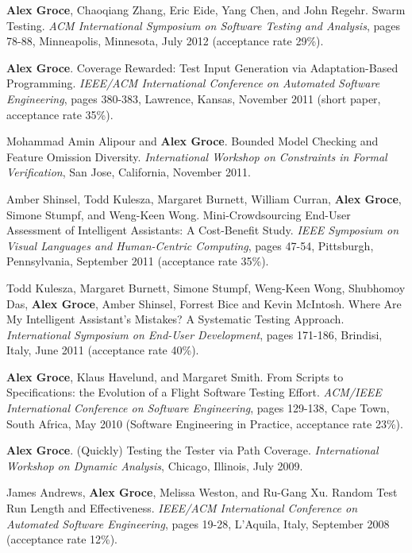 \documentclass[ComputerScience]{vita}
\begin{document}
\begin{vita}
\begin{Refereed Conference and Workshop Publications}
\item {\bf Alex Groce}, Chaoqiang Zhang, Eric Eide, Yang Chen, and John Regehr.
\newblock Swarm Testing.
\newblock \emph{ACM International Symposium on Software Testing and Analysis}, pages 78-88, Minneapolis, Minnesota, July 2012 (acceptance rate 29\%).

\item {\bf Alex Groce}.
\newblock Coverage Rewarded: Test Input Generation via Adaptation-Based Programming.
\newblock \emph{IEEE/ACM International Conference on Automated Software Engineering}, pages 380-383, Lawrence, Kansas, November 2011 (short paper, acceptance rate 35\%).

\item
Mohammad Amin Alipour and {\bf Alex Groce}.
\newblock Bounded Model Checking and Feature Omission Diversity.
\newblock \emph{International Workshop on Constraints in Formal Verification}, San Jose, California, November 2011.

\item
Amber Shinsel, Todd Kulesza, Margaret Burnett, William Curran, {\bf Alex Groce}, Simone Stumpf, and Weng-Keen Wong.
\newblock Mini-Crowdsourcing End-User Assessment of Intelligent Assistants: A Cost-Benefit Study.
\newblock \emph{IEEE Symposium on Visual Languages and Human-Centric Computing}, pages 47-54, Pittsburgh, Pennsylvania, September 2011 (acceptance rate 35\%).

\item
Todd Kulesza, Margaret Burnett, Simone Stumpf, Weng-Keen Wong, Shubhomoy Das, {\bf Alex Groce}, Amber Shinsel, Forrest Bice and Kevin McIntosh.
\newblock Where Are My Intelligent Assistant's Mistakes?  A Systematic Testing Approach.
\newblock \emph{International Symposium on End-User Development}, pages 171-186, Brindisi, Italy, June 2011 (acceptance rate 40\%).

\item
{\bf Alex Groce}, Klaus Havelund, and Margaret Smith.
\newblock From Scripts to Specifications: the Evolution of a Flight Software Testing Effort.
\newblock \emph{ACM/IEEE International Conference on Software Engineering}, pages 129-138, Cape Town, South Africa, May 2010 (Software Engineering in Practice, acceptance rate 23\%). 

\item
{\bf Alex Groce}.
\newblock (Quickly) Testing the Tester via Path Coverage.
\newblock \emph{International Workshop on Dynamic Analysis}, Chicago, Illinois, July 2009.

\item
James Andrews, {\bf Alex Groce}, Melissa Weston, and Ru-Gang Xu.
\newblock Random Test Run Length and Effectiveness.
\newblock \emph{IEEE/ACM International Conference on Automated Software Engineering}, pages 19-28, L'Aquila, Italy, September 2008 (acceptance rate 12\%).


\end{Refereed Conference and Workshop Publications}
\end{vita}
\end{document}
